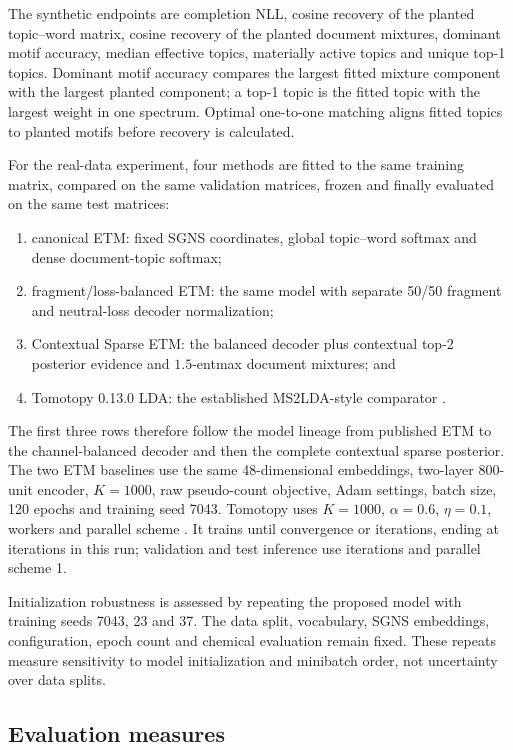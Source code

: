 \documentclass[10pt,a4paper]{article}
\begin{document}
The synthetic endpoints are completion NLL, cosine recovery of the planted
topic--word matrix, cosine recovery of the planted document mixtures, dominant
motif accuracy, median effective topics, materially active topics and unique
top-1 topics. Dominant motif accuracy compares the largest fitted mixture
component with the largest planted component; a top-1 topic is the fitted topic
with the largest weight in one spectrum. Optimal one-to-one matching aligns
fitted topics to planted motifs before recovery is calculated.

For the real-data experiment, four methods are fitted to the same training
matrix, compared on the same validation matrices, frozen and finally evaluated
on the same test matrices:
\begin{enumerate}
  \item canonical ETM: fixed SGNS coordinates, global topic--word softmax and
  dense document-topic softmax;
  \item fragment/loss-balanced ETM: the same model with separate 50/50
  fragment and neutral-loss decoder normalization;
  \item Contextual Sparse ETM: the balanced decoder plus contextual top-2
  posterior evidence and $1.5$-entmax document mixtures; and
  \item Tomotopy 0.13.0 LDA: the established MS2LDA-style comparator
  \cite{tomotopy}.
\end{enumerate}
The first three rows therefore follow the model lineage from published ETM to
the channel-balanced decoder and then the complete contextual sparse posterior.
The two ETM baselines use the same 48-dimensional embeddings, two-layer
800-unit encoder, $K=1000$, raw pseudo-count objective, Adam settings, batch
size, 120 epochs and training seed 7043. Tomotopy uses $K=1000$,
$\alpha=0.6$, $\eta=0.1$, \TomotopyWorkers{} workers and parallel scheme
\TomotopyParallelScheme{}. It trains until convergence or
\TomotopyMaximumIterations{} iterations, ending at
\TomotopyTrainingIterations{} iterations in this run; validation and test
inference use \TomotopyInferenceIterations{} iterations and parallel scheme 1.

Initialization robustness is assessed by repeating the proposed model with
training seeds 7043, 23 and 37. The data split, vocabulary, SGNS embeddings,
configuration, epoch count and chemical evaluation remain fixed. These repeats
measure sensitivity to model initialization and minibatch order, not uncertainty
over data splits.

\subsection{Evaluation measures}
\end{document}
